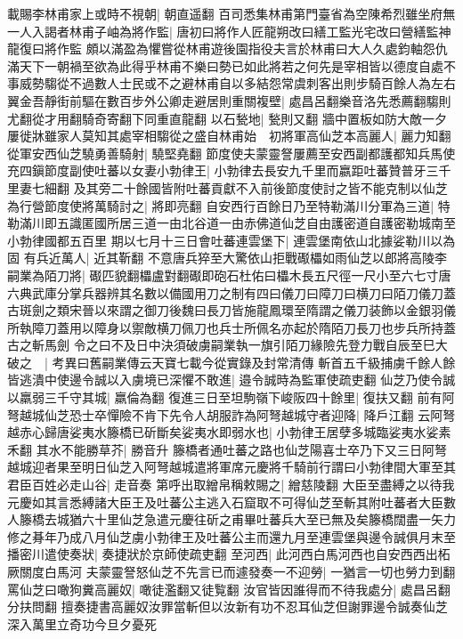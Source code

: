 載賜李林甫家上或時不視朝|{
	朝直遥翻}
百司悉集林甫第門臺省為空陳希烈雖坐府無一人入謁者林甫子岫為將作監|{
	唐初曰將作人匠龍朔改曰繕工監光宅改曰營繕監神龍復曰將作監}
頗以滿盈為懼嘗從林甫遊後園指役夫言於林甫曰大人久處鈞軸怨仇滿天下一朝禍至欲為此得乎林甫不樂曰勢已如此將若之何先是宰相皆以德度自處不事威勢騶從不過數人士民或不之避林甫自以多結怨常虞刺客出則步騎百餘人為左右翼金吾靜街前驅在數百步外公卿走避居則重關複壁|{
	處昌呂翻樂音洛先悉薦翻騶則尤翻從才用翻騎奇寄翻下同重直龍翻}
以石甃地|{
	甃則又翻}
牆中置板如防大敵一夕屢徙牀雖家人莫知其處宰相騶從之盛自林甫始　初將軍高仙芝本高麗人|{
	麗力知翻}
從軍安西仙芝驍勇善騎射|{
	驍堅堯翻}
節度使夫蒙靈詧屢薦至安西副都護都知兵馬使充四鎭節度副使吐蕃以女妻小勃律王|{
	小勃律去長安九千里而嬴距吐蕃贊普牙三千里妻七細翻}
及其旁二十餘國皆附吐蕃貢獻不入前後節度使討之皆不能克制以仙芝為行營節度使將萬騎討之|{
	將即亮翻}
自安西行百餘日乃至特勒滿川分軍為三道|{
	特勒滿川即五識匿國所居三道一由北谷道一由赤佛道仙芝自由護密道自護密勒城南至小勃律國都五百里}
期以七月十三日會吐蕃連雲堡下|{
	連雲堡南依山北據娑勒川以為固}
有兵近萬人|{
	近其靳翻}
不意唐兵猝至大驚依山拒戰礟櫑如雨仙芝以郎將高陵李嗣業為陌刀將|{
	礟匹貌翻櫑盧對翻礟即砲石杜佑曰櫑木長五尺徑一尺小至六七寸唐六典武庫分掌兵器辨其名數以備國用刀之制有四曰儀刀曰障刀曰横刀曰陌刀儀刀蓋古斑劍之類宋晉以來謂之御刀後魏曰長刀皆施龍鳳環至隋謂之儀刀装飾以金銀羽儀所執障刀蓋用以障身以禦敵横刀佩刀也兵士所佩名亦起於隋陌刀長刀也步兵所持蓋古之斬馬劍}
令之曰不及日中決須破虜嗣業執一旗引陌刀緣險先登力戰自辰至巳大破之　|{
	考異曰舊嗣業傳云天寶七載今從實錄及封常清傳}
斬首五千級捕虜千餘人餘皆逃潰中使邊令誠以入虜境已深懼不敢進|{
	邉令誠時為監軍使疏吏翻}
仙芝乃使令誠以羸弱三千守其城|{
	羸倫為翻}
復進三日至坦駒嶺下峻阪四十餘里|{
	復扶又翻}
前有阿弩越城仙芝恐士卒憚險不肯下先令人胡服詐為阿弩越城守者迎降|{
	降戶江翻}
云阿弩越赤心歸唐娑夷水籐橋已斫斷矣娑夷水即弱水也|{
	小勃律王居孽多城臨娑夷水娑素禾翻}
其水不能勝草芥|{
	勝音升}
籐橋者通吐蕃之路也仙芝陽喜士卒乃下又三日阿弩越城迎者果至明日仙芝入阿弩越城遣將軍席元慶將千騎前行謂曰小勃律間大軍至其君臣百姓必走山谷|{
	走音奏}
第呼出取繒帛稱敕賜之|{
	繒慈陵翻}
大臣至盡縛之以待我元慶如其言悉縛諸大臣王及吐蕃公主逃入石窟取不可得仙芝至斬其附吐蕃者大臣數人籐橋去城猶六十里仙芝急遣元慶往斫之甫畢吐蕃兵大至已無及矣籐橋闊盡一矢力修之朞年乃成八月仙芝虜小勃律王及吐蕃公主而還九月至連雲堡與邊令誠俱月末至播密川遣使奏狀|{
	奏捷狀於京師使疏吏翻}
至河西|{
	此河西白馬河西也自安西西出柘厥關度白馬河}
夫蒙靈詧怒仙芝不先言已而遽發奏一不迎勞|{
	一猶言一切也勞力到翻}
罵仙芝曰噉狗糞高麗奴|{
	噉徒濫翻又徒覧翻}
汝官皆因誰得而不待我處分|{
	處昌呂翻分扶問翻}
擅奏捷書高麗奴汝罪當斬但以汝新有功不忍耳仙芝但謝罪邊令誠奏仙芝深入萬里立奇功今旦夕憂死

